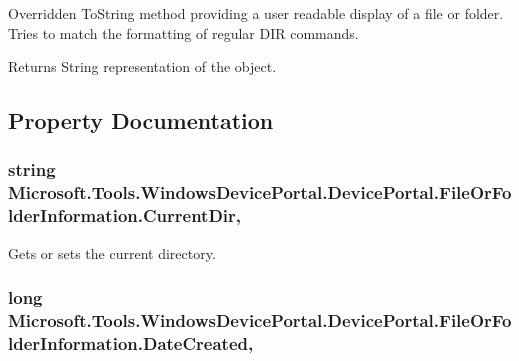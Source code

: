 Overridden To\+String method providing a user readable display of a file or folder. Tries to match the formatting of regular D\+IR commands. 

\begin{DoxyReturn}{Returns}
String representation of the object.
\end{DoxyReturn}


\subsection{Property Documentation}
\subsubsection[{\texorpdfstring{Current\+Dir}{CurrentDir}}]{\setlength{\rightskip}{0pt plus 5cm}string Microsoft.\+Tools.\+Windows\+Device\+Portal.\+Device\+Portal.\+File\+Or\+Folder\+Information.\+Current\+Dir\hspace{0.3cm}{\ttfamily [get]}, {\ttfamily [set]}}\hypertarget{class_microsoft_1_1_tools_1_1_windows_device_portal_1_1_device_portal_1_1_file_or_folder_information_a8747e01e3e4ed046356e804ccf68c14f}{}\label{class_microsoft_1_1_tools_1_1_windows_device_portal_1_1_device_portal_1_1_file_or_folder_information_a8747e01e3e4ed046356e804ccf68c14f}


Gets or sets the current directory. 

\subsubsection[{\texorpdfstring{Date\+Created}{DateCreated}}]{\setlength{\rightskip}{0pt plus 5cm}long Microsoft.\+Tools.\+Windows\+Device\+Portal.\+Device\+Portal.\+File\+Or\+Folder\+Information.\+Date\+Created\hspace{0.3cm}{\ttfamily [get]}, {\ttfamily [set]}}\hypertarget{class_microsoft_1_1_tools_1_1_windows_device_portal_1_1_device_portal_1_1_file_or_folder_information_a6b53f93c5a67f14b3686a37f4bc2c873}{}\label{class_microsoft_1_1_tools_1_1_windows_device_portal_1_1_device_portal_1_1_file_or_folder_information_a6b53f93c5a67f14b3686a37f4bc2c873}


